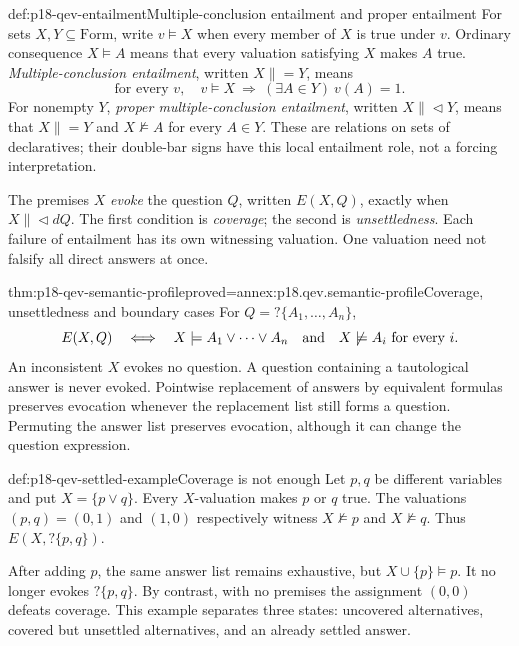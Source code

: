 \begin{hbdefinition}{def:p18-qev-entailment}{Multiple-conclusion entailment and proper entailment}
For sets \(X,Y\subseteq\mathrm{Form}\), write \(v\models X\)
when every member of \(X\) is true under \(v\). Ordinary consequence
\(X\models A\) means that every valuation satisfying \(X\) makes
\(A\) true. \emph{Multiple-conclusion entailment}, written
\(X\mathrel{\|=}Y\), means
\[
 \text{for every }v,\quad
 v\models X\ \Longrightarrow\ (\exists A\in Y)\ v(A)=1.
\]
For nonempty \(Y\), \emph{proper multiple-conclusion entailment},
written \(X\mathrel{\|\!\triangleleft}Y\), means that
\(X\mathrel{\|=}Y\) and \(X\not\models A\) for every \(A\in Y\).
These are relations on sets of declaratives; their double-bar signs have
this local entailment role, not a forcing interpretation.

The premises \(X\) \emph{evoke} the question \(Q\), written
\(E(X,Q)\), exactly when \(X\mathrel{\|\!\triangleleft}dQ\).
The first condition is \emph{coverage}; the second is
\emph{unsettledness}. Each failure of entailment has its own witnessing
valuation. One valuation need not falsify all direct answers at once.
\end{hbdefinition}

\begin{hbtheorem}{thm:p18-qev-semantic-profile}{proved=annex:p18.qev.semantic-profile}{Coverage, unsettledness and boundary cases}
For \(Q=?\{A_1,\ldots,A_n\}\),
\[
 E(X,Q)\quad\Longleftrightarrow\quad
 X\models A_1\lor\cdots\lor A_n
 \quad\hbox{and}\quad
 X\not\models A_i\text{ for every }i.
\]
An inconsistent \(X\) evokes no question. A question containing a
tautological answer is never evoked. Pointwise replacement of answers
by equivalent formulas preserves evocation whenever the replacement
list still forms a question. Permuting the answer list preserves
evocation, although it can change the question expression.
\end{hbtheorem}

\begin{hbexample}{def:p18-qev-settled-example}{Coverage is not enough}
Let \(p,q\) be different variables and put \(X=\{p\lor q\}\).
Every \(X\)-valuation makes \(p\) or \(q\) true. The valuations
\((p,q)=(0,1)\) and \((1,0)\) respectively witness
\(X\not\models p\) and \(X\not\models q\). Thus
\(E(X,?\{p,q\})\).

After adding \(p\), the same answer list remains exhaustive, but
\(X\cup\{p\}\models p\). It no longer evokes \(?\{p,q\}\).
By contrast, with no premises the assignment \((0,0)\) defeats
coverage. This example separates three states: uncovered alternatives,
covered but unsettled alternatives, and an already settled answer.
\end{hbexample}

